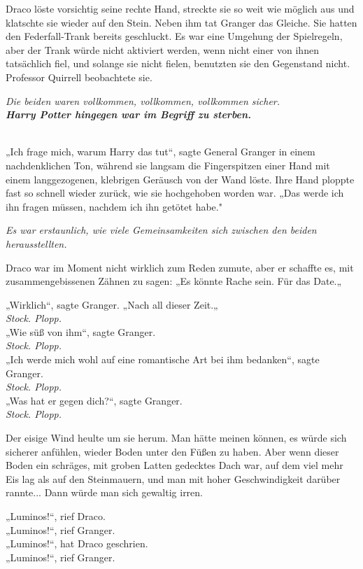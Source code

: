 {Draco löste vorsichtig seine rechte Hand, streckte sie so weit wie möglich aus und klatschte sie wieder auf den Stein. Neben ihm tat Granger das Gleiche. Sie hatten den Federfall-Trank bereits geschluckt. Es war eine Umgehung der Spielregeln, aber der Trank würde nicht aktiviert werden, wenn nicht einer von ihnen tatsächlich fiel, und solange sie nicht fielen, benutzten sie den Gegenstand nicht. Professor Quirrell beobachtete sie.

\emph{Die beiden waren vollkommen, vollkommen, vollkommen sicher.}\\ \textbf{\emph{Harry Potter hingegen war im Begriff zu sterben.}\\ }\strut \\ „Ich frage mich, warum Harry das tut“, sagte General Granger in einem nachdenklichen Ton, während sie langsam die Fingerspitzen einer Hand mit einem langgezogenen, klebrigen Geräusch von der Wand löste. Ihre Hand ploppte fast so schnell wieder zurück, wie sie hochgehoben worden war. „Das werde ich ihn fragen müssen, nachdem ich ihn getötet habe."

\emph{Es war erstaunlich, wie viele Gemeinsamkeiten sich zwischen den beiden herausstellten.}

Draco war im Moment nicht wirklich zum Reden zumute, aber er schaffte es, mit zusammengebissenen Zähnen zu sagen: „Es könnte Rache sein. Für das Date.„

„Wirklich“, sagte Granger. „Nach all dieser Zeit.„\\ \emph{Stock. Plopp.}\\ „Wie süß von ihm“, sagte Granger.\\ \emph{Stock. Plopp.}\\ „Ich werde mich wohl auf eine romantische Art bei ihm bedanken“, sagte Granger.\\ \emph{Stock. Plopp.}\\ „Was hat er gegen dich?“, sagte Granger.\\ \emph{Stock. Plopp.}

Der eisige Wind heulte um sie herum. Man hätte meinen können, es würde sich sicherer anfühlen, wieder Boden unter den Füßen zu haben. Aber wenn dieser Boden ein schräges, mit groben Latten gedecktes Dach war, auf dem viel mehr Eis lag als auf den Steinmauern, und man mit hoher Geschwindigkeit darüber rannte... Dann würde man sich gewaltig irren.

„Luminos!“, rief Draco.\\ „Luminos!“, rief Granger.\\ „Luminos!“, hat Draco geschrien.\\ „Luminos!“, rief Granger.

}
